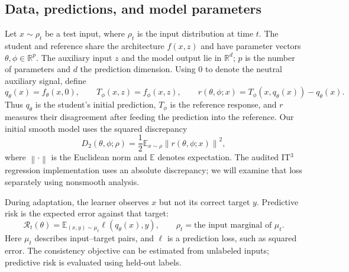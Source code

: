 \documentclass[11pt,a4paper]{article}
\newcommand{\E}{\mathbb{E}}
\newcommand{\R}{\mathbb{R}}
\newcommand{\norm}[1]{\left\lVert#1\right\rVert}
\newcommand{\Risk}{\mathcal{R}}
\begin{document}
\subsection{Data, predictions, and model parameters}
Let $x\sim\rho_t$ be a test input, where $\rho_t$ is the input distribution at time $t$. The student and reference share the architecture $f(x,z)$ and have parameter vectors $\theta,\phi\in\R^p$. The auxiliary input $z$ and the model output lie in $\R^d$; $p$ is the number of parameters and $d$ the prediction dimension. Using $0$ to denote the neutral auxiliary signal, define
\begin{equation}
q_\theta(x)=f_\theta(x,0),\qquad
T_\phi(x,z)=f_\phi(x,z),\qquad
r(\theta,\phi;x)=T_\phi(x,q_\theta(x))-q_\theta(x).
\label{eq:residual}
\end{equation}
Thus $q_\theta$ is the student's initial prediction, $T_\phi$ is the reference response, and $r$ measures their disagreement after feeding the prediction into the reference. Our initial smooth model uses the squared discrepancy
\begin{equation}
D_2(\theta,\phi;\rho)=\frac12\E_{x\sim\rho}\norm{r(\theta,\phi;x)}^2,
\label{eq:squared}
\end{equation}
where $\norm{\cdot}$ is the Euclidean norm and $\E$ denotes expectation. The audited IT$^3$ regression implementation uses an absolute discrepancy; we will examine that loss separately using nonsmooth analysis.

During adaptation, the learner observes $x$ but not its correct target $y$. Predictive risk is the expected error against that target:
\begin{equation}
\Risk_t(\theta)=\E_{(x,y)\sim\mu_t}\ell(q_\theta(x),y),\qquad
\rho_t=\text{the input marginal of }\mu_t.
\label{eq:risk}
\end{equation}
Here $\mu_t$ describes input--target pairs, and $\ell$ is a prediction loss, such as squared error. The consistency objective can be estimated from unlabeled inputs; predictive risk is evaluated using held-out labels.
\end{document}
